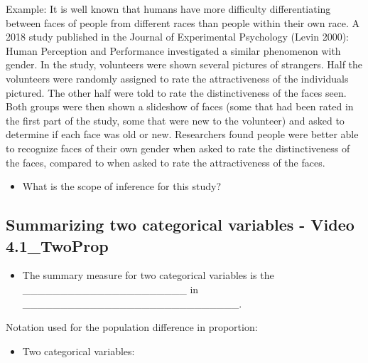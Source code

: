 \documentclass[
]{report}
\providecommand{\tightlist}{%
  \setlength{\itemsep}{0pt}\setlength{\parskip}{0pt}}
\begin{document}
Example: It is well known that humans have more difficulty differentiating between faces of people from different races than people within their own race. A 2018 study published in the Journal of Experimental Psychology (Levin 2000): Human Perception and Performance investigated a similar phenomenon with gender. In the study, volunteers were shown several pictures of strangers. Half the volunteers were randomly assigned to rate the attractiveness of the individuals pictured. The other half were told to rate the distinctiveness of the faces seen. Both groups were then shown a slideshow of faces (some that had been rated in the first part of the study, some that were new to the volunteer) and asked to determine if each face was old or new. Researchers found people were better able to recognize faces of their own gender when asked to rate the distinctiveness of the faces, compared to when asked to rate the attractiveness of the faces.

\begin{itemize}
\tightlist
\item
  What is the scope of inference for this study?
\end{itemize}

\vspace{0.5in}


\newpage

\subsection*{Summarizing two categorical variables - Video 4.1\_TwoProp}\label{summarizing-two-categorical-variables---video-4.1_twoprop}

\begin{itemize}
\tightlist
\item
  The summary measure for two categorical variables is the \_\_\_\_\_\_\_\_\_\_\_\_\_\_\_\_\_\_\_\_\_\_ in \_\_\_\_\_\_\_\_\_\_\_\_\_\_\_\_\_\_\_\_\_\_\_\_\_\_\_\_\_.
\end{itemize}

Notation used for the population difference in proportion:

\begin{itemize}
\tightlist
\item
  Two categorical variables:
\end{itemize}

\vspace{0.2in}
\end{document}
